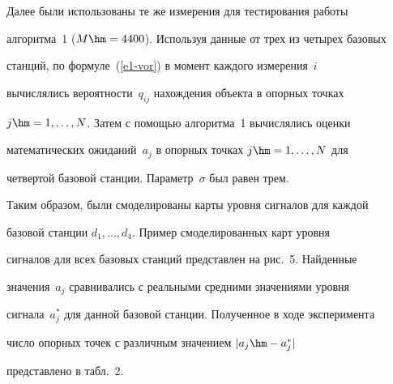  Далее были использованы те же измерения для тестирования работы

алгоритма~1 ($M\hm= 4400$). Используя данные от трех из четырех базовых

станций, по формуле~(\ref{e1-vor}) в момент каждого измерения~$i$

вычислялись вероятности~$q_{ij}$ на\-хож\-де\-ния объекта в опорных точках

$j\hm= 1,\ldots , N$. Затем с помощью алгоритма~1 вычислялись оценки

математических ожиданий~$a_j$ в опорных точках $j\hm= 1,\ldots , N$ для

четвертой базовой станции. Параметр~$\sigma$ был равен трем.



 Таким образом, были смоделированы карты уровня сигналов для каждой

базовой станции $d_1,\ldots , d_4$. Пример смоделированных карт уровня

сигналов для всех базовых станций представлен на рис.~5. Найденные

значения~$a_j$ сравнивались с реальными средними значениями уровня

сигнала~$a_j^*$ для данной базовой станции. Полученное в ходе эксперимента

число опорных точек с различным значением $\vert a_j\hm- a_j^*\vert$

представлено в табл.~2.




